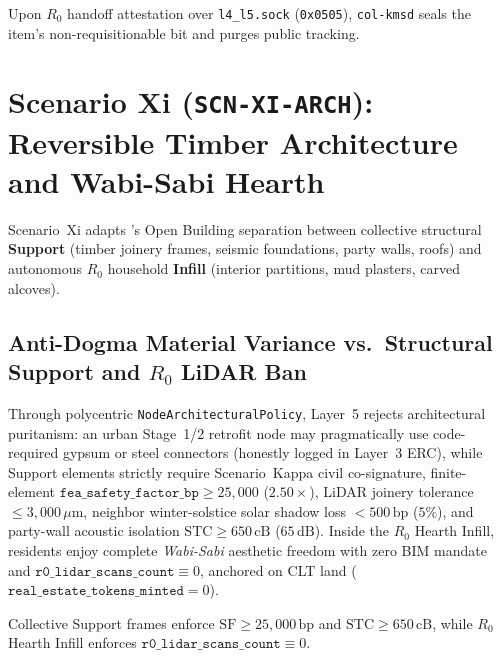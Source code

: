 Upon $R_0$ handoff attestation over \texttt{l4\_l5.sock} (\texttt{0x0505}), \texttt{col-kmsd} seals
the item's non-requisitionable bit and purges public tracking.

\section{Scenario Xi (\texttt{SCN-XI-ARCH}): Reversible Timber Architecture and Wabi-Sabi Hearth}
\label{sec:waved-xi}

Scenario~Xi adapts \textcite{habraken1972supports}'s Open Building separation between collective
structural \textbf{Support} (timber joinery frames, seismic foundations, party walls, roofs) and autonomous
$R_0$ household \textbf{Infill} (interior partitions, mud plasters, carved alcoves).

\subsection{Anti-Dogma Material Variance vs.\ Structural Support and $R_0$ LiDAR Ban}

Through polycentric \texttt{NodeArchitecturalPolicy}, Layer~5 rejects architectural puritanism: an
urban Stage~1/2 retrofit node may pragmatically use code-required gypsum or steel connectors (honestly
logged in Layer~3 ERC), while Support elements strictly require Scenario~Kappa civil co-signature,
finite-element $\mathtt{fea\_safety\_factor\_bp} \ge 25{,}000$ ($2.50\times$), LiDAR joinery
tolerance $\le 3{,}000\,\mu\mathrm{m}$, neighbor winter-solstice solar shadow loss $< 500\,\mathrm{bp}$
($5\%$), and party-wall acoustic isolation $\mathrm{STC} \ge 650\,\mathrm{cB}$ ($65\,\mathrm{dB}$).
Inside the $R_0$ Hearth Infill, residents enjoy complete \textit{Wabi-Sabi} aesthetic freedom with zero BIM
mandate and $\mathtt{r0\_lidar\_scans\_count} \equiv 0$, anchored on CLT land ($\mathtt{real\_estate\_tokens\_minted} = 0$).

\begin{invariant}
\label{inv:waved-xi-habraken}
Collective Support frames enforce $\mathrm{SF} \ge 25{,}000\,\mathrm{bp}$ and $\mathrm{STC} \ge 650\,\mathrm{cB}$,
while $R_0$ Hearth Infill enforces $\mathtt{r0\_lidar\_scans\_count} \equiv 0$.
\end{invariant}

